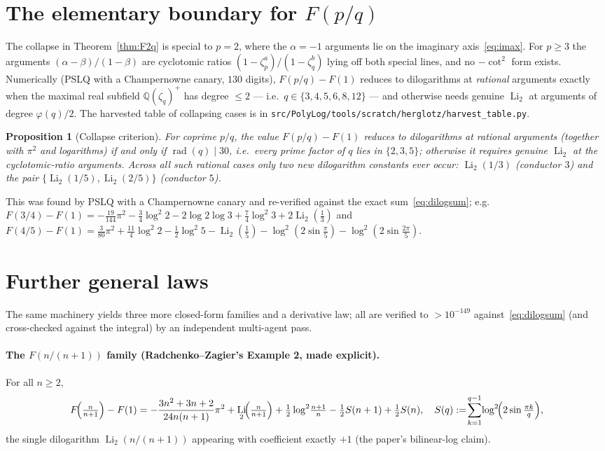\documentclass[11pt]{article}
\DeclareMathOperator{\Li}{Li}
\theoremstyle{plain}\newtheorem{theorem}{Theorem}\newtheorem{proposition}[theorem]{Proposition}
\theoremstyle{remark}\newtheorem{remark}[theorem]{Remark}
\begin{document}
\section{The elementary boundary for $F(p/q)$}
The collapse in Theorem~\ref{thm:F2q} is special to $p=2$, where the $\alpha=-1$ arguments lie on the
imaginary axis~\eqref{eq:imax}. For $p\ge3$ the arguments $(\alpha-\beta)/(1-\beta)$ are cyclotomic ratios
$(1-\zeta_p^a)/(1-\zeta_q^b)$ lying off both special lines, and no $-\cot^2$ form exists. Numerically (PSLQ
with a Champernowne canary, $130$ digits), $F(p/q)-F(1)$ reduces to dilogarithms at \emph{rational} arguments
exactly when the maximal real subfield $\mathbb Q(\zeta_q)^+$ has degree $\le2$ --- i.e.\ $q\in\{3,4,5,6,8,12\}$
--- and otherwise needs genuine $\Li_2$ at arguments of degree $\varphi(q)/2$. The harvested table of
collapsing cases is in \texttt{src/PolyLog/tools/scratch/herglotz/harvest\_table.py}.

\begin{proposition}[Collapse criterion]\label{prop:collapse}
For coprime $p/q$, the value $F(p/q)-F(1)$ reduces to dilogarithms at \emph{rational} arguments (together with
$\pi^2$ and logarithms) if and only if $\operatorname{rad}(q)\mid 30$, i.e.\ every prime factor of $q$ lies in
$\{2,3,5\}$; otherwise it requires genuine $\Li_2$ at the cyclotomic-ratio arguments. Across all such rational
cases only two new dilogarithm constants ever occur: $\Li_2(1/3)$ (conductor $3$) and the pair
$\{\Li_2(1/5),\Li_2(2/5)\}$ (conductor $5$).
\end{proposition}
This was found by PSLQ with a Champernowne canary and re-verified against the exact sum~\eqref{eq:dilogsum}; e.g.
$F(3/4)-F(1)=-\tfrac{19}{144}\pi^2-\tfrac34\log^2 2-2\log2\log3+\tfrac74\log^2 3+2\Li_2(\tfrac13)$ and
$F(4/5)-F(1)=\tfrac{3}{80}\pi^2+\tfrac{11}4\log^2 2-\tfrac12\log^2 5-\Li_2(\tfrac15)-\log^2(2\sin\tfrac\pi5)-\log^2(2\sin\tfrac{2\pi}5)$.

\section{Further general laws}
The same machinery yields three more closed-form families and a derivative law; all are verified to
$>10^{-149}$ against~\eqref{eq:dilogsum} (and cross-checked against the integral) by an independent
multi-agent pass.

\paragraph{The $F(n/(n+1))$ family (Radchenko--Zagier's Example 2, made explicit).} For all $n\ge2$,
\[
  F\!\Bigl(\tfrac{n}{n+1}\Bigr)-F(1)=-\frac{3n^2+3n+2}{24n(n+1)}\pi^2+\Li_2\!\Bigl(\tfrac{n}{n+1}\Bigr)
  +\tfrac12\log^2\!\tfrac{n+1}{n}-\tfrac12 S(n+1)+\tfrac12 S(n),\quad S(q):=\!\sum_{k=1}^{q-1}\!\log^2\!\Bigl(2\sin\tfrac{\pi k}q\Bigr),
\]
the single dilogarithm $\Li_2(n/(n+1))$ appearing with coefficient exactly $+1$ (the paper's bilinear-log claim).
\end{document}
